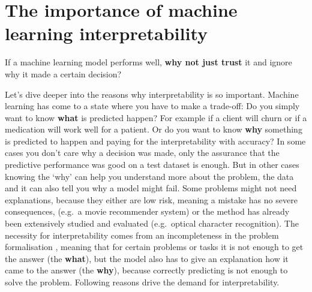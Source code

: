 \documentclass[12pt,]{krantz}
\theoremstyle{definition}
\theoremstyle{definition}
\theoremstyle{definition}
\theoremstyle{remark}
\begin{document}
\section{The importance of machine learning
interpretability}\label{interpretability.importance}

If a machine learning model performs well, \textbf{why not just trust}
it and ignore why it made a certain decision?

Let's dive deeper into the reasons why interpretability is so important.
Machine learning has come to a state where you have to make a trade-off:
Do you simply want to know \textbf{what} is predicted happen? For
example if a client will churn or if a medication will work well for a
patient. Or do you want to know \textbf{why} something is predicted to
happen and paying for the interpretability with accuracy? In some cases
you don't care why a decision was made, only the assurance that the
predictive performance was good on a test dataset is enough. But in
other cases knowing the `why' can help you understand more about the
problem, the data and it can also tell you why a model might fail. Some
problems might not need explanations, because they either are low risk,
meaning a mistake has no severe consequences, (e.g.~a movie recommender
system) or the method has already been extensively studied and evaluated
(e.g.~optical character recognition). The necessity for interpretability
comes from an incompleteness in the problem formalisation
\citep{Doshi-Velez2017}, meaning that for certain problems or tasks it
is not enough to get the answer (the \textbf{what}), but the model also
has to give an explanation how it came to the answer (the \textbf{why}),
because correctly predicting is not enough to solve the problem.
Following reasons drive the demand for interpretability.
\end{document}
